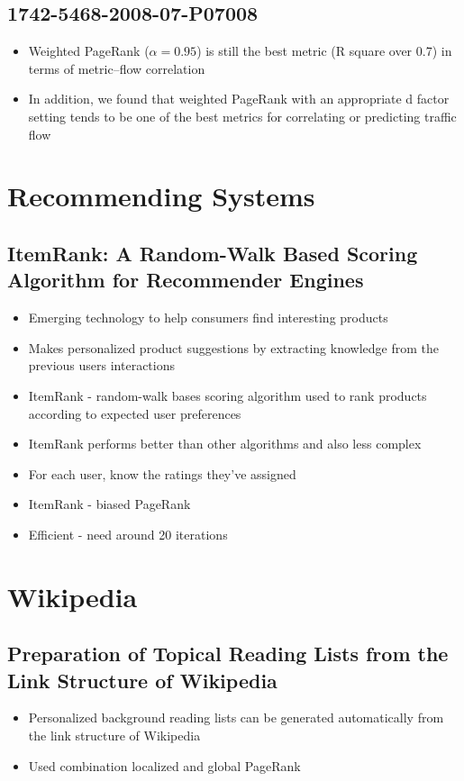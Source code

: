 \documentclass[11pt]{report}
\begin{document}
\section{1742-5468-2008-07-P07008}
\begin{itemize}
\item Weighted PageRank ($\alpha= 0.95$) is still the best metric (R square over 0.7) in terms of metric–flow correlation
\item In addition, we found that weighted PageRank with an
appropriate d factor setting tends to be one of the best metrics for correlating or predicting
traffic flow
\end{itemize}
\chapter{Recommending Systems}
\section{ItemRank: A Random-Walk Based Scoring Algorithm for Recommender Engines}
\begin{itemize}
\item Emerging technology to help consumers find interesting products
\item Makes personalized product suggestions by extracting knowledge from the previous users interactions
\item ItemRank - random-walk bases scoring algorithm used to rank products according to expected user preferences
\item ItemRank performs better than other algorithms and also less complex
\item For each user, know the ratings they've assigned
\item ItemRank - biased PageRank
\item Efficient - need around 20 iterations
\end{itemize}
\chapter{Wikipedia}
\section{Preparation of Topical Reading Lists from the Link Structure of Wikipedia}
\begin{itemize}
\item Personalized background reading lists can be generated automatically from the link structure of Wikipedia
\item Used combination localized and global PageRank
\end{itemize}
\end{document}
